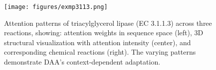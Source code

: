 \begin{figure}[h]
    \texttt{[image: figures/exmp3113.png]}
    \caption{Attention patterns of triacylglycerol lipase (EC 3.1.1.3) across three reactions, showing: attention weights in sequence space (left), 3D structural visualization with attention intensity (center), and corresponding chemical reactions (right). The varying patterns demonstrate DAA's context-dependent adaptation.}
    \label{fig:exmp}
\end{figure}
